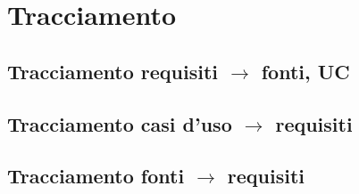 \section{Tracciamento}

\subsection{Tracciamento requisiti $\rightarrow$ fonti, UC}

\subsection{Tracciamento casi d'uso $\rightarrow$ requisiti}

\subsection{Tracciamento fonti $\rightarrow$ requisiti}
